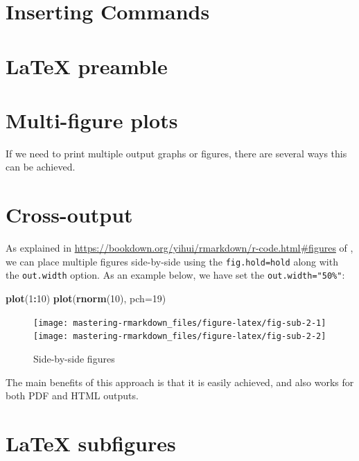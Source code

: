 \documentclass[]{book}
\newenvironment{Shaded}{\begin{snugshade}}{\end{snugshade}}
\newcommand{\KeywordTok}[1]{\textcolor[rgb]{0.13,0.29,0.53}{\textbf{#1}}}
\newcommand{\DataTypeTok}[1]{\textcolor[rgb]{0.13,0.29,0.53}{#1}}
\newcommand{\DecValTok}[1]{\textcolor[rgb]{0.00,0.00,0.81}{#1}}
\newcommand{\OperatorTok}[1]{\textcolor[rgb]{0.81,0.36,0.00}{\textbf{#1}}}
\newcommand{\NormalTok}[1]{#1}
\begin{document}
\section{Inserting Commands}\label{inserting-commands}

\section{LaTeX preamble}\label{latex-preamble}

\section{Multi-figure plots}\label{multi-figure-plots}

If we need to print multiple output graphs or figures, there are several
ways this can be achieved.

\section{Cross-output}\label{cross-output}

As explained in
\url{https://bookdown.org/yihui/rmarkdown/r-code.html\#figures} of
\citet{xie2018}, we can place multiple figures side-by-side using the
\texttt{fig.hold=\textquotesingle{}hold\textquotesingle{}} along with
the \texttt{out.width} option. As an example below, we have set the
\texttt{out.width="50\%"}:

\begin{Shaded}
\begin{Highlighting}[]
\KeywordTok{plot}\NormalTok{(}\DecValTok{1}\OperatorTok{:}\DecValTok{10}\NormalTok{)}
\KeywordTok{plot}\NormalTok{(}\KeywordTok{rnorm}\NormalTok{(}\DecValTok{10}\NormalTok{), }\DataTypeTok{pch=}\DecValTok{19}\NormalTok{)}
\end{Highlighting}
\end{Shaded}

\begin{figure}
\texttt{[image: mastering-rmarkdown\_files/figure-latex/fig-sub-2-1]} \texttt{[image: mastering-rmarkdown\_files/figure-latex/fig-sub-2-2]} \caption{Side-by-side figures}\label{fig:fig-sub-2}
\end{figure}

The main benefits of this approach is that it is easily achieved, and
also works for both PDF and HTML outputs.

\section{LaTeX subfigures}\label{latex-subfigures}
\end{document}
